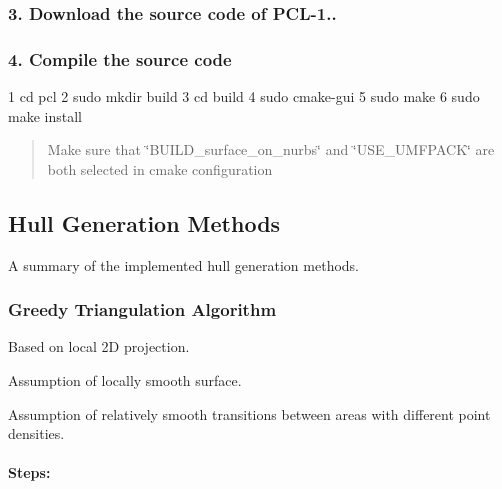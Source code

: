 \subsubsection*{3. Download the source code of P\+C\+L-\/1..}





\subsubsection*{4. Compile the source code}


\begin{DoxyCode}
1 cd pcl
2 sudo mkdir build
3 cd build
4 sudo cmake-gui
5 sudo make
6 sudo make install
\end{DoxyCode}


\begin{quote}
Make sure that \char`\"{}\+B\+U\+I\+L\+D\+\_\+surface\+\_\+on\+\_\+nurbs\char`\"{} and \char`\"{}\+U\+S\+E\+\_\+\+U\+M\+F\+P\+A\+C\+K\char`\"{} are both selected in cmake configuration \end{quote}




\subsection*{Hull Generation Methods}

A summary of the implemented hull generation methods. 



\subsubsection*{Greedy Triangulation Algorithm}


\begin{DoxyItemize}
\item Based on local 2D projection.
\item Assumption of locally smooth surface.
\item Assumption of relatively smooth transitions between areas with different point densities.
\end{DoxyItemize}

\paragraph*{Steps\+:}



